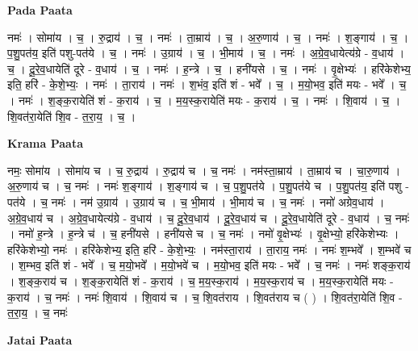 \documentclass[17pt]{extarticle}
\begin{document}
\textbf{Pada Paata} \newline

नमः॑ । सोमा॑य । च॒ । रु॒द्राय॑ । च॒ । नमः॑ । ता॒म्राय॑ । च॒ । अ॒रु॒णाय॑ । च॒ । नमः॑ । श॒ङ्गाय॑ । च॒ । प॒शु॒पत॑य॒ इति॑ पशु-पत॑ये । च॒ । नमः॑ । उ॒ग्राय॑ । च॒ । भी॒माय॑ । च॒ । नमः॑ । अ॒ग्रे॒व॒धायेत्य॑ग्रे - व॒धाय॑ । च॒ । दू॒रे॒व॒धायेति॑ दूरे - व॒धाय॑ । च॒ । नमः॑ । ह॒न्त्रे । च॒ । हनी॑यसे । च॒ । नमः॑ । वृ॒क्षेभ्यः॑ । हरि॑केशेभ्य॒ इति॒ हरि॑ - के॒शे॒भ्यः॒ । नमः॑ । ता॒राय॑ । नमः॑ । श॒भंव॒ इति॑ शं - भवे᳚ । च॒ । म॒यो॒भव॒ इति॑ मयः - भवे᳚ । च॒ । नमः॑ । श॒ङ्क॒रायेति॑ शं - क॒राय॑ । च॒ । म॒य॒स्क॒रायेति॑ मयः - क॒राय॑ । च॒ । नमः॑ । शि॒वाय॑ । च॒ । शि॒वत॑रा॒येति॑ शि॒व - त॒रा॒य॒ । च॒ ।  \newline


\textbf{Krama Paata} \newline

नमः॒ सोमा॑य । सोमा॑य च । च॒ रु॒द्राय॑ । रु॒द्राय॑ च । च॒ नमः॑ । नम॑स्ता॒म्राय॑ । ता॒म्राय॑ च । चा॒रु॒णाय॑ । अ॒रु॒णाय॑ च । च॒ नमः॑ । नमः॑ श॒ङ्गाय॑ । श॒ङ्गाय॑ च । च॒ प॒शु॒पत॑ये । प॒शु॒पत॑ये च । प॒शु॒पत॑य॒ इति॑ पशु - पत॑ये । च॒ नमः॑ । नम॑ उ॒ग्राय॑ । उ॒ग्राय॑ च । च॒ भी॒माय॑ । भी॒माय॑ च । च॒ नमः॑ । नमो॑ अग्रेव॒धाय॑ । अ॒ग्रे॒व॒धाय॑ च । अ॒ग्रे॒व॒धायेत्य॑ग्रे - व॒धाय॑ । च॒ दू॒रे॒व॒धाय॑ । दू॒रे॒व॒धाय॑ च । दू॒रे॒व॒धायेति॑ दूरे - व॒धाय॑ । च॒ नमः॑ । नमो॑ ह॒न्त्रे । ह॒न्त्रे च॑ । च॒ हनी॑यसे । हनी॑यसे च । च॒ नमः॑ । नमो॑ वृ॒क्षेभ्यः॑ । वृ॒क्षेभ्यो॒ हरि॑केशेभ्यः । हरि॑केशेभ्यो॒ नमः॑ । हरि॑केशेभ्य॒ इति॒ हरि॑ - के॒शे॒भ्यः॒ । नम॑स्ता॒राय॑ । ता॒राय॒ नमः॑ । नमः॑ श॒म्भवे᳚ । श॒म्भवे॑ च । श॒म्भव॒ इति॑ शं - भवे᳚ । च॒ म॒यो॒भवे᳚ । म॒यो॒भवे॑ च । म॒यो॒भव॒ इति॑ मयः - भवे᳚ । च॒ नमः॑ । नमः॑ शङ्क॒राय॑ । श॒ङ्क॒राय॑ च । श॒ङ्क॒रायेति॑ शं - क॒राय॑ । च॒ म॒य॒स्क॒राय॑ । म॒य॒स्क॒राय॑ च । म॒य॒स्क॒रायेति॑ मयः - क॒राय॑ । च॒ नमः॑ । नमः॑ शि॒वाय॑ । शि॒वाय॑ च । च॒ शि॒वत॑राय । शि॒वत॑राय च ( ) । शि॒वत॑रा॒येति॑ शि॒व - त॒रा॒य॒ । च॒ नमः॑ \newline

\textbf{Jatai Paata} \newline
\end{document}
